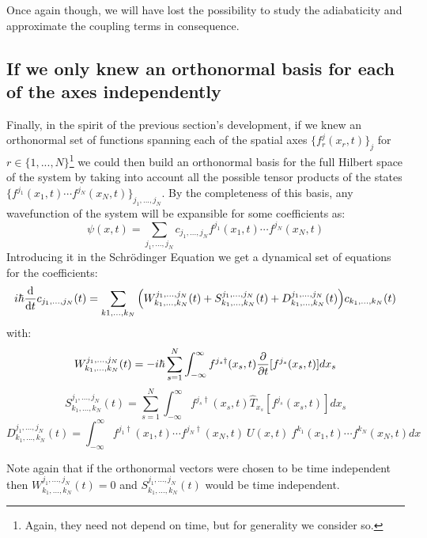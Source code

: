 \documentclass[11pt, a4paper]{article} %
\begin{document}
Once again though, we will have lost the possibility to study the adiabaticity and approximate the coupling terms in consequence.

\subsection{If we only knew an orthonormal basis for each of the axes independently}
Finally, in the spirit of the previous section's development, if we knew an orthonormal set of functions spanning each of the spatial axes $\{ f^j_r(x_r,t) \}_j$ for $r\in\{1,...,N \}$\footnote{Again, they need not depend on time, but for generality we consider so.} we could then build an orthonormal basis for the full Hilbert space of the system by taking into account all the possible tensor products of the states $\{f^{j_1}(x_1,t)\cdots f^{j_N}(x_N,t) \}_{j_1,...,j_N}$. By the completeness of this basis, any wavefunction of the system will be expansible for some coefficients as:
\begin{equation}
\psi(x,t)=\sum_{j_1,...,j_N} c_{j_1,...,j_N} f^{j_1}(x_1,t)\cdots f^{j_N}(x_N,t)
\end{equation}
Introducing it in the Schrödinger Equation we get a dynamical set of equations for the coefficients:
\begin{equation}
i\hbar \dv{}{t} c_{j_1,...,j_N}(t) = \sum_{k1,...,k_N} \qty(W^{j_1,...,j_N}_{k_1,...,k_N}(t)+S^{j_1,...,j_N}_{k_1,...,k_N}(t)+D^{j_1,...,j_N}_{k_1,...,k_N}(t))c_{k_1,...,k_N}(t)
\end{equation}
with:
\begin{equation}
W^{j_1,...,j_N}_{k_1,...,k_N}(t)=-i\hbar \sum_{s=1}^N \int_{-\infty}^{\infty}f^{j_s\dagger}(x_s,t)\pdv{}{t}[f^{j_s}(x_s,t)]dx_s
\end{equation}
\begin{equation}
S^{j_1,...,j_N}_{k_1,...,k_N}(t)=\sum_{s=1}^N \int_{-\infty}^{\infty}f^{j_s\dagger}(x_s,t)\hat{T}_{x_s}[f^{j_s}(x_s,t)]dx_s
\end{equation}
\begin{equation}
D^{j_1,...,j_N}_{k_1,...,k_N}(t)=\int_{-\infty}^{\infty}f^{j_1\dagger}(x_1,t)\cdots f^{j_N\dagger}(x_N,t)\ U(x,t)\ f^{k_1}(x_1,t)\cdots f^{k_N}(x_N,t) dx
\end{equation}

Note again that if the orthonormal vectors were chosen to be time independent then $W^{j_1,...,j_N}_{k_1,...,k_N}(t)=0$ and $S^{j_1,...,j_N}_{k_1,...,k_N}(t)$ would be time independent. 
\end{document}
